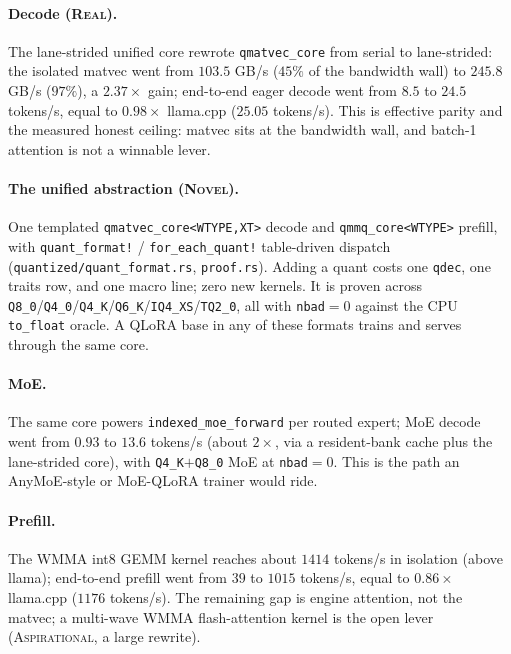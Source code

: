 \documentclass[11pt]{article}
\begin{document}
\paragraph{Decode (\textsc{Real}).} The lane-strided unified core rewrote \texttt{qmatvec\_core} from serial to lane-strided: the isolated matvec went from $103.5$ GB/s ($45\%$ of the bandwidth wall) to $245.8$ GB/s ($97\%$), a $2.37\times$ gain; end-to-end eager decode went from $8.5$ to $24.5$ tokens/s, equal to $0.98\times$ llama.cpp ($25.05$ tokens/s). This is effective parity and the measured honest ceiling: matvec sits at the bandwidth wall, and batch-1 attention is not a winnable lever.

\paragraph{The unified abstraction (\textsc{Novel}).} One templated \texttt{qmatvec\_core<WTYPE,XT>} decode and \texttt{qmmq\_core<WTYPE>} prefill, with \texttt{quant\_format!} / \texttt{for\_each\_quant!} table-driven dispatch (\texttt{quantized/quant\_format.rs}, \texttt{proof.rs}). Adding a quant costs one \texttt{qdec}, one traits row, and one macro line; zero new kernels. It is proven across \texttt{Q8\_0}/\texttt{Q4\_0}/\texttt{Q4\_K}/\texttt{Q6\_K}/\texttt{IQ4\_XS}/\texttt{TQ2\_0}, all with \texttt{nbad}$=0$ against the CPU \texttt{to\_float} oracle. A QLoRA base in any of these formats trains and serves through the same core.

\paragraph{MoE.} The same core powers \texttt{indexed\_moe\_forward} per routed expert; MoE decode went from $0.93$ to $13.6$ tokens/s (about $2\times$, via a resident-bank cache plus the lane-strided core), with \texttt{Q4\_K}$+$\texttt{Q8\_0} MoE at \texttt{nbad}$=0$. This is the path an AnyMoE-style or MoE-QLoRA trainer would ride.

\paragraph{Prefill.} The WMMA int8 GEMM kernel reaches about $1414$ tokens/s in isolation (above llama); end-to-end prefill went from $39$ to $1015$ tokens/s, equal to $0.86\times$ llama.cpp ($1176$ tokens/s). The remaining gap is engine attention, not the matvec; a multi-wave WMMA flash-attention kernel is the open lever (\textsc{Aspirational}, a large rewrite).
\end{document}
